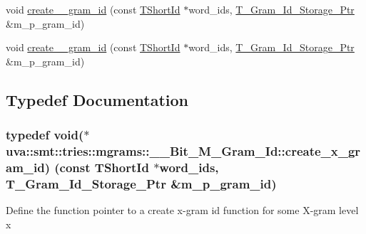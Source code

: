 \begin{DoxyCompactItemize}
void \hyperlink{namespaceuva_1_1smt_1_1tries_1_1mgrams_1_1_____bit___m___gram___id_a61aeb772c001b8af69726ba412c76b9e}{create\+\_\+\_\+gram\+\_\+id} (const \hyperlink{namespaceuva_1_1smt_1_1hashing_adcf22e1982ad09d3a63494c006267469}{T\+Short\+Id} $\ast$word\+\_\+ids, \hyperlink{namespaceuva_1_1smt_1_1tries_1_1mgrams_1_1_m___gram___id_a478e6468dbd5dab37599c566d77c845c}{T\+\_\+\+Gram\+\_\+\+Id\+\_\+\+Storage\+\_\+\+Ptr} \&m\+\_\+p\+\_\+gram\+\_\+id)
\item 
void \hyperlink{namespaceuva_1_1smt_1_1tries_1_1mgrams_1_1_____bit___m___gram___id_ad46b547948e5a0c6504b14d4ba84468a}{create\+\_\+\_\+gram\+\_\+id} (const \hyperlink{namespaceuva_1_1smt_1_1hashing_adcf22e1982ad09d3a63494c006267469}{T\+Short\+Id} $\ast$word\+\_\+ids, \hyperlink{namespaceuva_1_1smt_1_1tries_1_1mgrams_1_1_m___gram___id_a478e6468dbd5dab37599c566d77c845c}{T\+\_\+\+Gram\+\_\+\+Id\+\_\+\+Storage\+\_\+\+Ptr} \&m\+\_\+p\+\_\+gram\+\_\+id)
\end{DoxyCompactItemize}


\subsection{Typedef Documentation}
\hypertarget{namespaceuva_1_1smt_1_1tries_1_1mgrams_1_1_____bit___m___gram___id_a848e9f221e40bfc02b580b84bee83f42}{}
\subsubsection[{create\+\_\+x\+\_\+gram\+\_\+id}]{\setlength{\rightskip}{0pt plus 5cm}typedef void($\ast$ uva\+::smt\+::tries\+::mgrams\+::\+\_\+\+\_\+\+Bit\+\_\+\+M\+\_\+\+Gram\+\_\+\+Id\+::create\+\_\+x\+\_\+gram\+\_\+id) (const {\bf T\+Short\+Id} $\ast$word\+\_\+ids, {\bf T\+\_\+\+Gram\+\_\+\+Id\+\_\+\+Storage\+\_\+\+Ptr} \&m\+\_\+p\+\_\+gram\+\_\+id)}\label{namespaceuva_1_1smt_1_1tries_1_1mgrams_1_1_____bit___m___gram___id_a848e9f221e40bfc02b580b84bee83f42}
Define the function pointer to a create x-\/gram id function for some X-\/gram level x \hypertarget{namespaceuva_1_1smt_1_1tries_1_1mgrams_1_1_____bit___m___gram___id_a105ea5e949d0fadfa8344e3618b522b3}{}
